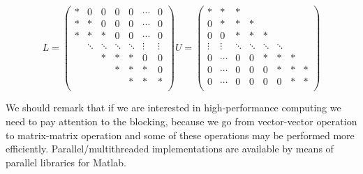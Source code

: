\documentclass[computational_mathematics.tex]{subfiles}
\begin{document}
\[
L = \begin{pmatrix}
  \ast & 0 & 0 & 0 & 0 & \cdots & 0\\
  \ast & \ast & 0 & 0 & 0 & \cdots & 0\\
  \ast & \ast & \ast & 0 & 0 & \cdots & 0\\
  & \ddots & \ddots & \ddots & \ddots & \vdots & \vdots\\
  & & \ast & \ast & \ast & 0 & 0\\
  & & & \ast & \ast & \ast & 0\\
  & & & & \ast & \ast & \ast\\
\end{pmatrix}
U = \begin{pmatrix}
  \ast & \ast & \ast & & & & & \\
  0 & \ast & \ast & \ast & & & \\
  0 & 0 & \ast & \ast & \ast & & & \\
  \vdots & \vdots & \ddots & \ddots & \ddots & \ddots & \\
  0 & \cdots & 0 & 0 & \ast & \ast & \ast & \\
  0 & \cdots & 0 & 0 & 0 & \ast & \ast & \ast\\
  0 & \cdots & 0 & 0 & 0 & 0 & \ast & \ast\\
\end{pmatrix}
\]

\begin{obs}
We should remark that if we are interested in high-performance computing we need to pay attention to the blocking, because we go from vector-vector operation to matrix-matrix operation and some of these operations may be performed more efficiently. Parallel/multithreaded implementations are available by means of parallel libraries for Matlab.
\end{obs}

\end{document}
